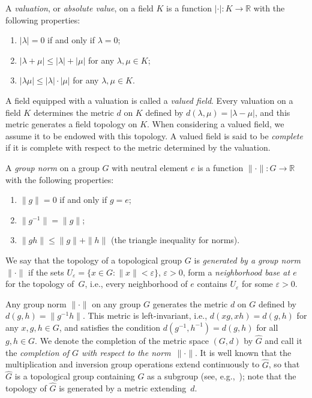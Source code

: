 \documentclass[a4paper]{amsart}
\theoremstyle{definition}
\let\le\leqslant
\begin{document}
A \emph{valuation}, or \emph{absolute value}, on a field $K$ is a function 
$\lvert\boldsymbol\cdot\rvert\colon K\to \mathbb R$ with the following properties:
\begin{enumerate}
\item
$|\lambda|=0$ if and only if $\lambda = 0$; 
\item
$|\lambda + \mu|\le |\lambda| + |\mu|$ for any $\lambda, \mu\in K$; 
\item
$|\lambda \mu|\le |\lambda|\cdot |\mu|$ for any $\lambda, \mu\in K$. 
\end{enumerate}
A field equipped with a valuation is called a \emph{valued field}. Every valuation on a field $K$ 
determines the metric $d$ on $K$ defined by $d(\lambda, \mu)=|\lambda-\mu|$, and this metric generates 
a field topology on $K$. When considering a valued field, we assume it to be endowed with this topology. 
A valued field is said to be \emph{complete} if it is complete with respect to the metric determined by the 
valuation. 

A \emph{group norm} on a group $G$ with neutral element $e$ is a function $\lVert\boldsymbol\cdot\rVert\colon G\to 
\mathbb R$ with the following properties: 
\begin{enumerate} 
\item $\|g\|=0$ if and only if $g=e$; 
\item $\|g^{-1}\| = \|g\|$; 
\item $\|gh\|\le \|g\|+\|h\|$ (the triangle inequality for norms). 
\end{enumerate} 
We say that the topology of a topological group $G$ is \emph{generated by a group norm} $\lVert \boldsymbol\cdot 
\rVert$ if the sets $U_\varepsilon=\{x\in G: \|x\|< \varepsilon\}$, $\varepsilon > 0$, form a \emph{neighborhood base at $e$} 
for the topology of~$G$, i.e., every neighborhood of $e$ contains $U_\varepsilon$ for some $\varepsilon>0$.

Any group norm $\lVert \boldsymbol\cdot\rVert$ on any group $G$ generates the metric $d$ on $G$ defined by 
$d(g,h)=\|g^{-1}h\|$. This metric is left-invariant, i.e., $d(xg, xh)=d(g,h)$ for any $x,g,h\in G$, and 
satisfies the condition $d(g^{-1}, h^{-1})= d(g, h)$ for all $g,h\in G$. We denote the completion of the metric 
space $(G,d)$ by $\widehat G$ and call it the \emph{completion of $G$ with respect to the norm}~$\lVert 
\boldsymbol\cdot\rVert$. It is well known that the multiplication and inversion group operations extend 
continuously to  $\widehat G$, so that $\widehat G$ is a topological group containing $G$ as a subgroup (see, 
e.g.,~\cite[pp.~352--353]{THJ}); note that the topology of $\widehat G$ is generated by a metric extending~$d$.
\end{document}
